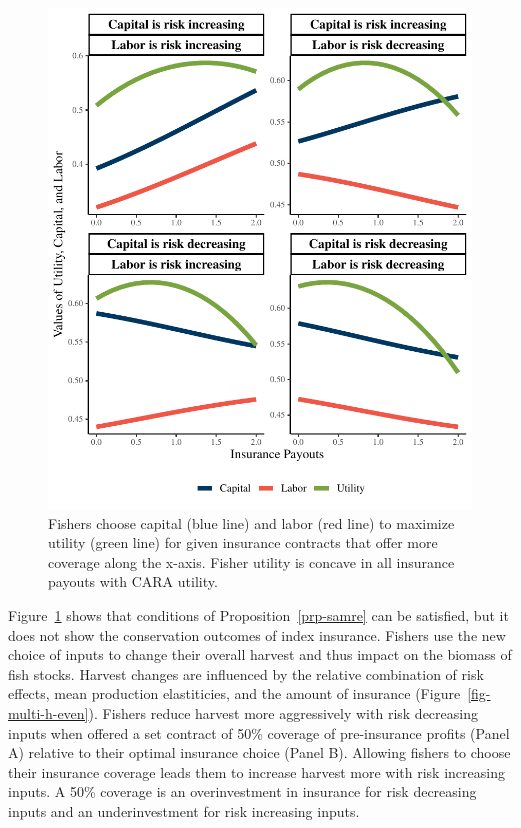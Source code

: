 \documentclass[
  letterpaper,
  DIV=11,
  numbers=noendperiod]{scrartcl}
\theoremstyle{plain}
\theoremstyle{plain}
\theoremstyle{remark}
\begin{document}
\begin{figure}

{\centering \includegraphics{ibi-behavior_files/figure-pdf/fig-ins-1.pdf}

}

\caption{\label{fig-ins}Fishers choose capital (blue line) and labor
(red line) to maximize utility (green line) for given insurance
contracts that offer more coverage along the x-axis. Fisher utility is
concave in all insurance payouts with CARA utility.}

\end{figure}

Figure~\ref{fig-ins} shows that conditions of
Proposition~\ref{prp-samre} can be satisfied, but it does not show the
conservation outcomes of index insurance. Fishers use the new choice of
inputs to change their overall harvest and thus impact on the biomass of
fish stocks. Harvest changes are influenced by the relative combination
of risk effects, mean production elastiticies, and the amount of
insurance (Figure~\ref{fig-multi-h-even}). Fishers reduce harvest more
aggressively with risk decreasing inputs when offered a set contract of
50\% coverage of pre-insurance profits (Panel A) relative to their
optimal insurance choice (Panel B). Allowing fishers to choose their
insurance coverage leads them to increase harvest more with risk
increasing inputs. A 50\% coverage is an overinvestment in insurance for
risk decreasing inputs and an underinvestment for risk increasing
inputs.
\end{document}
